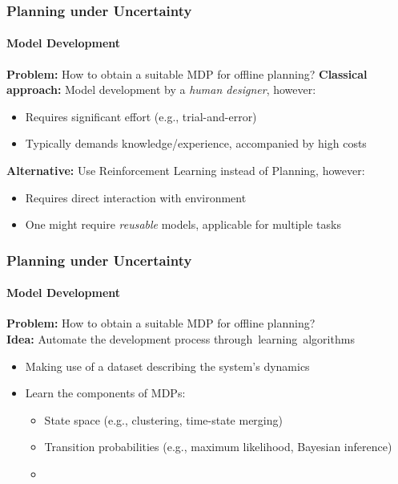 \begin{frame}
	\frametitle{Planning under Uncertainty}
	\framesubtitle{Model Development}
	
	\textcolor{tudBlack}{\textbf{Problem:}} How to obtain a suitable MDP for offline planning?
	\pause
	\vfill
	\textcolor{tudBlack}{\textbf{Classical approach:}} Model development by a \textit{human designer}, however:
	\begin{itemize}
		\item Requires significant effort (e.g., trial-and-error)
		\item Typically demands knowledge/experience, accompanied by high costs
	\end{itemize}
	\pause
	\vfill
	\textcolor{tudBlack}{\textbf{Alternative:}} Use Reinforcement Learning instead of Planning, however:
	\begin{itemize}
		\item Requires direct interaction with environment %
		\item One might require \textit{reusable} models, applicable for multiple tasks %
	\end{itemize}
\end{frame}

\begin{frame}[t]
	\frametitle{Planning under Uncertainty}
	\framesubtitle{Model Development}
	\vspace{8pt}
	\textcolor{tudBlack}{\textbf{Problem:}} How to obtain a suitable MDP for offline planning?\\
	\vspace{14pt}
	\textcolor{tudblue}{\textbf{Idea:}} Automate the development process through~learning~algorithms 
	\begin{itemize}
		\item<2-> Making use of a dataset describing the system's dynamics
		\item<3-> Learn the components of MDPs:
		\begin{itemize}
			\item State space (e.g., clustering, time-state merging)
			\item Transition probabilities (e.g., maximum likelihood, Bayesian inference)
			\item {}
		\end{itemize}
	\end{itemize}
	\vspace{10pt}
\end{frame}


